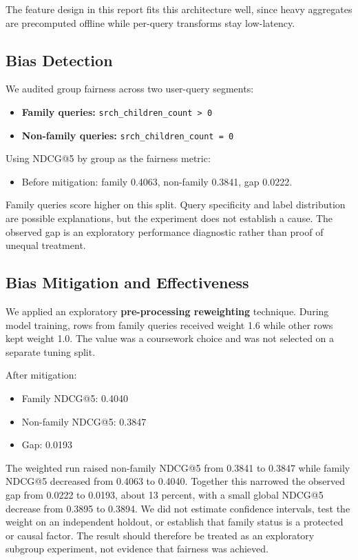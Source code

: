 \documentclass{llncs}
\begin{document}
The feature design in this report fits this architecture well, since heavy aggregates are precomputed offline while per-query transforms stay low-latency.

\subsection{Bias Detection}
We audited group fairness across two user-query segments:
\begin{itemize}
\item \textbf{Family queries:} \texttt{srch\_children\_count > 0}
\item \textbf{Non-family queries:} \texttt{srch\_children\_count = 0}
\end{itemize}

Using NDCG@5 by group as the fairness metric:
\begin{itemize}
\item Before mitigation: family 0.4063, non-family 0.3841, gap 0.0222.
\end{itemize}

Family queries score higher on this split. Query specificity and label distribution are possible explanations, but the experiment does not establish a cause. The observed gap is an exploratory performance diagnostic rather than proof of unequal treatment.

\subsection{Bias Mitigation and Effectiveness}
We applied an exploratory \textbf{pre-processing reweighting} technique. During model training, rows from family queries received weight 1.6 while other rows kept weight 1.0. The value was a coursework choice and was not selected on a separate tuning split.

After mitigation:
\begin{itemize}
\item Family NDCG@5: 0.4040
\item Non-family NDCG@5: 0.3847
\item Gap: 0.0193
\end{itemize}

The weighted run raised non-family NDCG@5 from 0.3841 to 0.3847 while family NDCG@5 decreased from 0.4063 to 0.4040. Together this narrowed the observed gap from 0.0222 to 0.0193, about 13 percent, with a small global NDCG@5 decrease from 0.3895 to 0.3894. We did not estimate confidence intervals, test the weight on an independent holdout, or establish that family status is a protected or causal factor. The result should therefore be treated as an exploratory subgroup experiment, not evidence that fairness was achieved.
\end{document}
